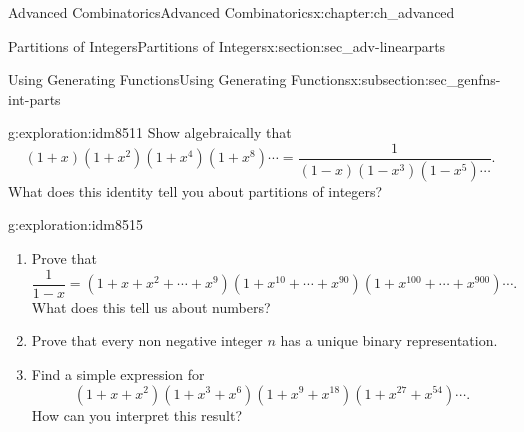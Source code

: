 \documentclass[oneside,10pt,]{book}
\numberwithin{equation}{chapter}
\begin{document}
\begin{chapterptx}{Advanced Combinatorics}{}{Advanced Combinatorics}{}{}{x:chapter:ch_advanced}
\begin{sectionptx}{Partitions of Integers}{}{Partitions of Integers}{}{}{x:section:sec_adv-linearparts}
\begin{subsectionptx}{Using Generating Functions}{}{Using Generating Functions}{}{}{x:subsection:sec_genfns-int-parts}
\begin{exploration}{}{g:exploration:idm8511}
Show algebraically that%
\begin{equation*}
(1+x)(1+x^2)(1+x^4)(1+x^8)\cdots = \frac{1}{(1-x)(1-x^3)(1-x^5)\cdots}\text{.}
\end{equation*}
What does this identity tell you about partitions of integers?%
\end{exploration}
\begin{exploration}{}{g:exploration:idm8515}%
\begin{enumerate}[font=\bfseries,label=(\alph*),ref=\alph*]
\item{}Prove that%
\begin{equation*}
\frac{1}{1-x} = (1 + x + x^2 +\cdots + x^9)(1 + x^{10} + \cdots + x^{90})(1 + x^{100} + \cdots + x^{900})\cdots.
\end{equation*}
What does this tell us about numbers?%
\item{}Prove that every non negative integer \(n\) has a unique binary representation.%
\item{}Find a simple expression for%
\begin{equation*}
(1+x+x^2)(1+x^3+x^6)(1+x^9+x^{18})(1+x^{27}+x^{54})\cdots.
\end{equation*}
How can you interpret this result?%
\end{enumerate}
\end{exploration}
\end{subsectionptx}
\end{sectionptx}
\end{chapterptx}
%
%
\typeout{************************************************}
\typeout{************************************************}
%
\end{document}

